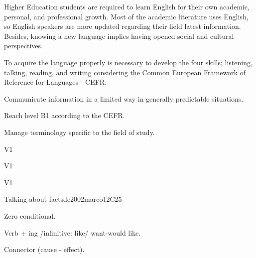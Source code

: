 \begin{syllabus}


\begin{justification}
Higher Education students are required to learn English for their own academic, 
personal, and professional growth. Most of the academic literature uses English, 
so English speakers are more updated regarding their field latest information. 
Besides, knowing a new language implies having opened social and 
cultural perspectives.  

To acquire the language properly is necessary to develop the four skills;
listening, talking, reading, and writing considering the 
Common European Framework of Reference for Languages - CEFR.
\end{justification}

\begin{goals}
\item Communicate information in a limited way in generally predictable situations.
\item Reach level B1 according to the CEFR.
\item Manage terminology specific to the field of study.
\end{goals}

\begin{outcomes}{V1}
\item {}
\end{outcomes}

\begin{specificoutcomes}{V1}
\item {}
\item {}
\item {}
\item {}
\end{specificoutcomes}

\begin{competences}{V1}
\item {}
\end{competences}

\begin{unit}{Talking about facts}{}{de2002marco}{12}{C25}
   \begin{topics}
      \item Zero conditional.
      \item Verb + ing /infinitive: like/ want-would like.
      \item Connector (cause - effect).
   \end{topics}


\end{unit}
\end{syllabus}
